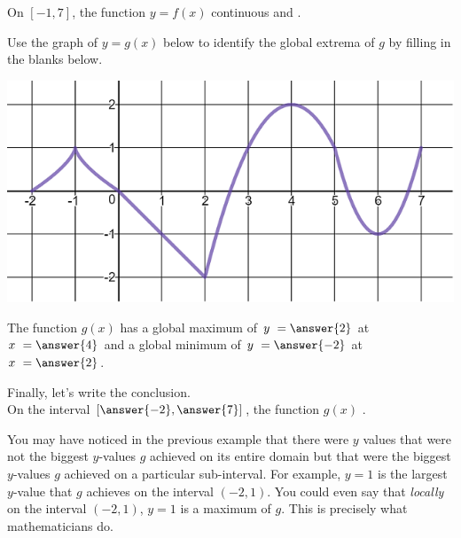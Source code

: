 \documentclass{ximera}
\begin{document}
\begin{exercise}
\begin{exercise}
\begin{exercise}
On $[-1,7]$, the function $y=f(x)$  continuous and .
\end{exercise}
\end{exercise}
\end{exercise}

\begin{exercise}
Use the graph of $y = g(x)$ below to identify the global extrema of $g$ by filling in the blanks below. 

\begin{center} \includegraphics[scale=0.5]{extrema3new.png} \end{center}

The function $g(x)$ has a global maximum of $y \ = \answer{2}$ at $x \ = \answer{4}$ and a global minimum of $y \ = \answer{-2}$ at $x \ = \answer{2}$.

\begin{exercise}
Finally, let's write the conclusion.  \\

On the  interval $\left[ \answer{-2}, \answer{7}\right]$, the function $g(x)$ .
\end{exercise}
\end{exercise}

You may have noticed in the previous example that there were $y$ values that were not the biggest $y$-values $g$ achieved on its entire domain but that were the biggest $y$-values $g$ achieved on a particular sub-interval.  For example, $y=1$ is the largest $y$-value that $g$ achieves on the interval $(-2, 1)$.  You could even say that \textit{locally} on the interval $(-2,1)$, $y=1$ is a maximum of $g$.  This is precisely what mathematicians do.  
\end{document}
